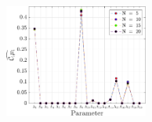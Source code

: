 \documentclass[1pt]{elsarticle}
\begin{document}
\begin{figure}[htbp]
\begin{center}
  \\ \vspace{5mm}
  \includegraphics[width=0.42\textwidth]{./Figures/ub_conv_kinetics_rich}
\end{center}
\end{figure}
\end{document}
